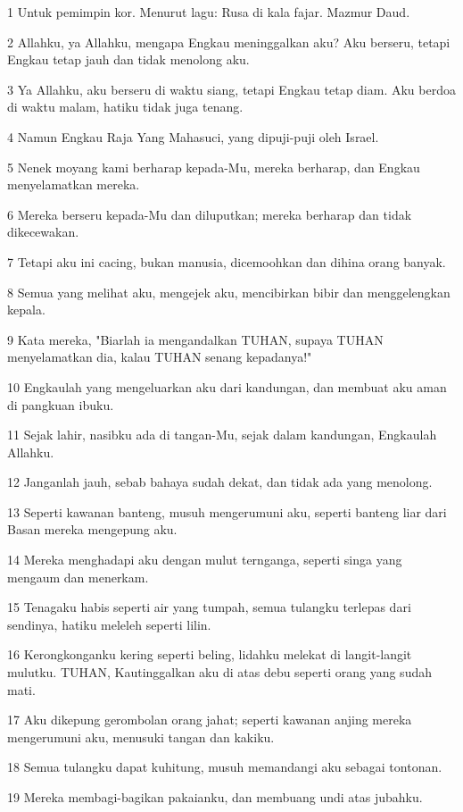 \par 1 Untuk pemimpin kor. Menurut lagu: Rusa di kala fajar. Mazmur Daud.
\par 2 Allahku, ya Allahku, mengapa Engkau meninggalkan aku? Aku berseru, tetapi Engkau tetap jauh dan tidak menolong aku.
\par 3 Ya Allahku, aku berseru di waktu siang, tetapi Engkau tetap diam. Aku berdoa di waktu malam, hatiku tidak juga tenang.
\par 4 Namun Engkau Raja Yang Mahasuci, yang dipuji-puji oleh Israel.
\par 5 Nenek moyang kami berharap kepada-Mu, mereka berharap, dan Engkau menyelamatkan mereka.
\par 6 Mereka berseru kepada-Mu dan diluputkan; mereka berharap dan tidak dikecewakan.
\par 7 Tetapi aku ini cacing, bukan manusia, dicemoohkan dan dihina orang banyak.
\par 8 Semua yang melihat aku, mengejek aku, mencibirkan bibir dan menggelengkan kepala.
\par 9 Kata mereka, "Biarlah ia mengandalkan TUHAN, supaya TUHAN menyelamatkan dia, kalau TUHAN senang kepadanya!"
\par 10 Engkaulah yang mengeluarkan aku dari kandungan, dan membuat aku aman di pangkuan ibuku.
\par 11 Sejak lahir, nasibku ada di tangan-Mu, sejak dalam kandungan, Engkaulah Allahku.
\par 12 Janganlah jauh, sebab bahaya sudah dekat, dan tidak ada yang menolong.
\par 13 Seperti kawanan banteng, musuh mengerumuni aku, seperti banteng liar dari Basan mereka mengepung aku.
\par 14 Mereka menghadapi aku dengan mulut ternganga, seperti singa yang mengaum dan menerkam.
\par 15 Tenagaku habis seperti air yang tumpah, semua tulangku terlepas dari sendinya, hatiku meleleh seperti lilin.
\par 16 Kerongkonganku kering seperti beling, lidahku melekat di langit-langit mulutku. TUHAN, Kautinggalkan aku di atas debu seperti orang yang sudah mati.
\par 17 Aku dikepung gerombolan orang jahat; seperti kawanan anjing mereka mengerumuni aku, menusuki tangan dan kakiku.
\par 18 Semua tulangku dapat kuhitung, musuh memandangi aku sebagai tontonan.
\par 19 Mereka membagi-bagikan pakaianku, dan membuang undi atas jubahku.
